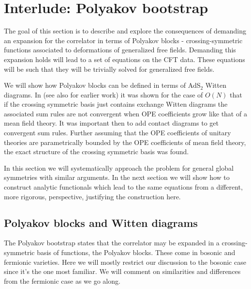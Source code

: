 \documentclass[12pt]{article}
\numberwithin{equation}{section}
\begin{document}
	
	
	
	
	\section{Interlude: Polyakov bootstrap}\label{sec:PolyakovBs}

		The goal of this section is to describe and explore the consequences of demanding an expansion for the correlator in terms of Polyakov blocks - crossing-symmetric functions associated to deformations of generalized free fields. Demanding this expansion holds will lead to a set of equations on the CFT data. These equations will be such that they will be trivially solved for generalized free fields. 
		
		We will show how Polyakov blocks can be defined in terms of AdS$_2$ Witten diagrams. In \cite{Ferrero:2019luz} (see also \cite{Dey:2016mcs} for earlier work) it was shown for the case of $O(N)$ that if the crossing symmetric basis just contains exchange Witten diagrams  the associated sum rules  are not convergent when OPE coefficients grow like that of a mean field theory. It was important then to add contact diagrams to get convergent sum rules. Further assuming that the OPE coefficients of unitary theories are parametrically bounded by the OPE coefficients of mean field theory, the exact structure of the crossing symmetric basis was found. 
		
		In this section we will systematically approach the problem for general global symmetries with similar arguments. In the next section we will show how to construct analytic functionals which lead to the same equations from a different, more rigorous, perspective, justifying the construction here. 
	
	
	 	\subsection{Polyakov blocks and Witten diagrams}
	
	The Polyakov bootstrap states that the correlator may be expanded in a crossing-symmetric basis of functions, the Polyakov blocks. These come in bosonic and fermionic varieties. Here we will mostly restrict our discussion to the bosonic case since it's the one most familiar. We will comment on similarities and differences from the fermionic case as we go along.
	
\end{document}
